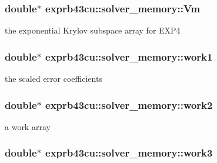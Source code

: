 \subsubsection[{\texorpdfstring{Vm}{Vm}}]{\setlength{\rightskip}{0pt plus 5cm}double$\ast$ exprb43cu\+::solver\+\_\+memory\+::\+Vm}\hypertarget{structexprb43cu_1_1solver__memory_a3b68c5a632fe265037cd25195e266c65}{}\label{structexprb43cu_1_1solver__memory_a3b68c5a632fe265037cd25195e266c65}


the exponential Krylov subspace array for E\+X\+P4 

\subsubsection[{\texorpdfstring{work1}{work1}}]{\setlength{\rightskip}{0pt plus 5cm}double$\ast$ exprb43cu\+::solver\+\_\+memory\+::work1}\hypertarget{structexprb43cu_1_1solver__memory_a97191dca9ff8d04d16d37b26fbea4906}{}\label{structexprb43cu_1_1solver__memory_a97191dca9ff8d04d16d37b26fbea4906}


the scaled error coefficients 

\subsubsection[{\texorpdfstring{work2}{work2}}]{\setlength{\rightskip}{0pt plus 5cm}double$\ast$ exprb43cu\+::solver\+\_\+memory\+::work2}\hypertarget{structexprb43cu_1_1solver__memory_a9339316b1097345efa3b55832b3d0d1c}{}\label{structexprb43cu_1_1solver__memory_a9339316b1097345efa3b55832b3d0d1c}


a work array 

\subsubsection[{\texorpdfstring{work3}{work3}}]{\setlength{\rightskip}{0pt plus 5cm}double$\ast$ exprb43cu\+::solver\+\_\+memory\+::work3}\hypertarget{structexprb43cu_1_1solver__memory_ae3a2fe062018c4b7f97f039feceeb003}{}\label{structexprb43cu_1_1solver__memory_ae3a2fe062018c4b7f97f039feceeb003}



